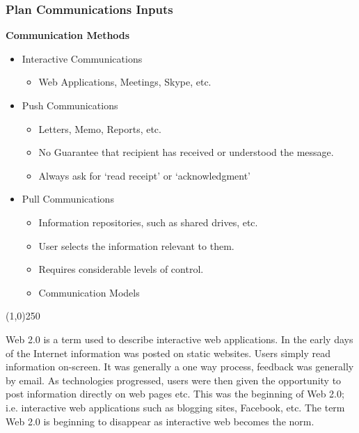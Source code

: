 \begin{frame}
\frametitle{Plan Communications \hfill\hfill Inputs}
\textbf{Communication Methods}
\begin{itemize}
	\item Interactive Communications
		\begin{itemize}
			\item Web Applications, Meetings, Skype, etc. 
		\end{itemize}
	\item Push Communications
		\begin{itemize}
			\item Letters, Memo, Reports, etc.
			\item No Guarantee that recipient has received or understood the message.
			\item Always ask for `read receipt' or `acknowledgment'
		\end{itemize}
	\item Pull Communications
		\begin{itemize}
			\item Information repositories, such as shared drives, etc.
			\item User selects the information relevant to them.
			\item Requires considerable levels of control.
			\item Communication Models
		\end{itemize}
\end{itemize}
\end{frame}\begin{center}\line(1,0){250}\end{center}

Web 2.0 is a term used to describe interactive web applications.  In the early days of the Internet information was posted on static websites.  Users simply read information on-screen.  It was generally a one way process, feedback was generally by email.  As technologies progressed, users were then given the opportunity to post information directly on web pages etc.  This was the beginning of Web 2.0; i.e. interactive web applications such as blogging sites, Facebook, etc.  The term Web 2.0 is beginning to disappear as interactive web becomes the norm.


